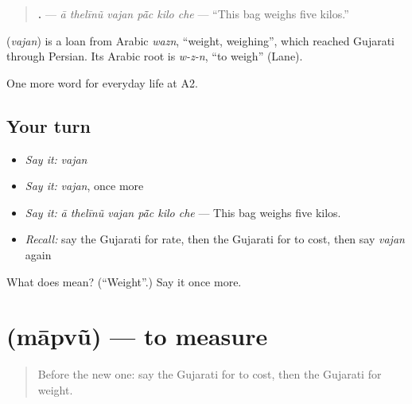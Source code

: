 \begin{quote}
\textbf{     .} — \emph{ā thelīnũ vajan pā̃c kilo che} — \textquotedblleft{}This bag weighs five kilos.\textquotedblright{}
\end{quote}

\begin{cousinweb}
\textbf{} (\emph{vajan}) is a loan from Arabic \emph{wazn}, \textquotedblleft{}weight, weighing\textquotedblright{}, which reached Gujarati through Persian. Its Arabic root is \emph{w-z-n}, \textquotedblleft{}to weigh\textquotedblright{} (Lane).
\end{cousinweb}

\begin{grammarlens}[title={What you've built}]
One more word for everyday life at A2.
\end{grammarlens}

\subsection*{Your turn}
\begin{itemize}
\raggedright
  \item \emph{Say it:} \emph{vajan}
  \item \emph{Say it:} \emph{vajan}, once more
  \item \emph{Say it:} \emph{ā thelīnũ vajan pā̃c kilo che} — This bag weighs five kilos.
  \item \emph{Recall:} say the Gujarati for rate, then the Gujarati for to cost, then say \emph{vajan} again
\end{itemize}

\begin{tcolorbox}[breakable,colback=teal!4,colframe=teal!35!black,title={Before you move on}]
What does  mean? (\textquotedblleft{}Weight\textquotedblright{}.) Say it once more.
\end{tcolorbox}
\section[\texorpdfstring{\gu{માપવું} (māpvũ)}{માપવું (māpvũ)}]{ (māpvũ) — to measure}

\label{lesson:GU-C184-mapvu}



\begin{quote}
Before the new one: say the Gujarati for to cost, then the Gujarati for weight.
\end{quote}

